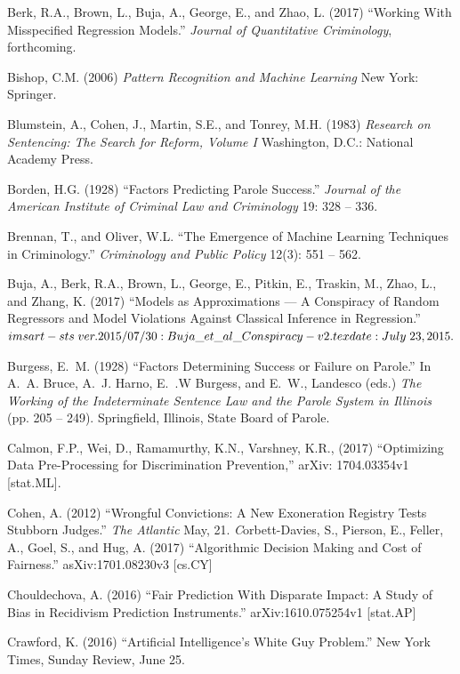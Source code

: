 \documentclass[12pt]{article}
\begin{document}
\begin{description}
\item
Berk, R.A., Brown, L., Buja, A., George, E., and Zhao, L. (2017) ``Working With Misspecified Regression Models.'' \textit{Journal of Quantitative Criminology}, forthcoming.
\item
Bishop, C.M. (2006) \textit{Pattern Recognition and Machine Learning} New York: Springer.
\item
Blumstein, A., Cohen, J., Martin, S.E., and Tonrey, M.H. (1983) \textit{Research on Sentencing: The Search for Reform, Volume I} Washington, D.C.: National Academy Press.
\item
Borden, H.G. (1928) ``Factors Predicting Parole Success.'' \textit{Journal of the American Institute of Criminal Law and Criminology} 19: 328 -- 336.
\item
Brennan, T., and Oliver, W.L. ``The Emergence of Machine Learning Techniques in Criminology.'' \textit{Criminology and Public Policy} 12(3): 551 -- 562.
\item
Buja, A., Berk, R.A., Brown, L., George, E., Pitkin, E., Traskin, M., Zhao, L., and Zhang, K. (2017) ``Models as Approximations --- A Conspiracy of Random Regressors and Model Violations Against Classical Inference in Regression.'' $imsart-sts  \hspace{.04in} ver. 2015/07/30: Buja\_et\_al\_Conspiracy-v2.tex date: July \hspace{.04in} 23, 2015.$
\item
Burgess, E.~M. (1928) ``Factors Determining Success or Failure on Parole.'' In A.~A. Bruce,  A.~J. Harno, E.~.W Burgess, and E.~W., Landesco (eds.) \textit{The Working of the Indeterminate Sentence Law and the Parole System in Illinois} (pp. 205 -- 249). Springfield, Illinois, State Board of Parole.
\item
Calmon, F.P., Wei, D., Ramamurthy, K.N., Varshney, K.R., (2017) ``Optimizing Data Pre-Processing for Discrimination Prevention,'' arXiv: 1704.03354v1 [stat.ML].
\item
Cohen, A. (2012) ``Wrongful Convictions: A New Exoneration Registry Tests Stubborn Judges.'' \textit{The Atlantic} May, 21.
\textit
Corbett-Davies, S., Pierson, E., Feller, A., Goel, S., and Hug, A. (2017) ``Algorithmic Decision Making and Cost of Fairness.''  asXiv:1701.08230v3 [cs.CY]
\item
Chouldechova, A. (2016) ``Fair Prediction With Disparate Impact:
A Study of Bias in Recidivism Prediction Instruments.'' arXiv:1610.075254v1 [stat.AP]
\item
Crawford, K. (2016) ``Artificial Intelligence's White Guy Problem.'' New York Times, Sunday Review, June 25.

\end{description}
\end{document}
